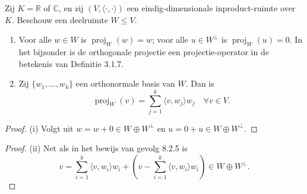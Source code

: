 \begin{lemma}[8.2.9]
    Zij $K = \mathbb{R}$ of $\mathbb{C}$, en zij $(V, \langle \cdot, \cdot \rangle)$ een eindig-dimensionale inproduct-ruimte over $K$. Beschouw een deelruimte $W \le V$.
    \begin{enumerate}
        \item[(i)] Voor alle $w \in W$ is $\operatorname{proj}_W(w) = w$; voor alle $u \in W^\perp$ is $\operatorname{proj}_W(u) = 0$. In het bijzonder is de orthogonale projectie een projectie-operator in de betekenis van Definitie 3.1.7.
        \item[(ii)] Zij $\{w_1, \dots, w_k\}$ een orthonormale basis van $W$. Dan is
        \[ \operatorname{proj}_W(v) = \sum_{j=1}^k \langle v, w_j \rangle w_j \quad \forall v \in V.\]
    \end{enumerate}
\end{lemma}

\begin{proof}(i)
    Volgt uit \(w =w + 0 \in W \oplus W^\perp \) en \(u = 0 + u \in W \oplus W^\perp\).
\end{proof}
\begin{proof}(ii)
    Net als in het bewijs van gevolg 8.2.5 is
    \[v=\sum_{i=1}^{k} \langle v,w_i\rangle w_i + \left(v - \sum_{i=1}^{k} \langle v,w_i\rangle w_i \right) \in W \oplus W^\perp.\]
\end{proof}



